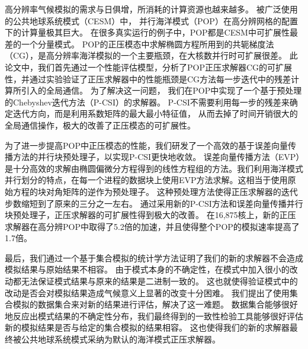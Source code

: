 \begin{cabstract}
  高分辨率气候模拟的需求与日俱增，所消耗的计算资源也越来越多。 
  被广泛使用的公共地球系统模式（CESM）中， 并行海洋模式（POP）在高分辨网格的配置下的计算量极其巨大。
  在很多真实运行的例子中，POP都是CESM中可扩展性最差的一个分量模式。 
  POP的正压模态中求解椭圆方程所用到的共轭梯度法（CG），是高分辨率海洋模拟的一个主要瓶颈，在大核数并行时可扩展很差。
  此论文中，我们首先通过一个性能评估模型，分析了POP正压求解器CG的可扩展性，并通过实验验证了正压求解器中的性能瓶颈是CG方法每一步迭代中的残差计算所引入的全局通信。 
  为了解决这一问题， 我们在POP中实现了一个基于预处理的Chebyshev迭代方法（P-CSI）的求解器。
  P-CSI不需要利用每一步的残差来确定迭代方向，而是利用系数矩阵的最大最小特征值，
  从而去掉了时间开销很大的全局通信操作，极大的改善了正压模态的可扩展性。

  为了进一步提高POP中正压模态的性能，我们研发了一个高效的基于误差向量传播方法的并行块预处理子，以实现P-CSI更快地收敛。 
  误差向量传播方法（EVP）是十分高效的求解由椭圆偏微分方程得到的线性方程组的方法。我们利用海洋模式并行划分的特点，在每一个进程的数据块上使用EVP方法求解。这相当于使用原始方程的块对角矩阵的逆作为预处理子。
  这种预处理方法使得正压求解器的迭代步数缩短到了原来的三分之一左右。 
  通过采用新的P-CSI方法和误差向量传播并行块预处理子，正压求解器的可扩展性得到极大的改善。 在16,875核上，新的正压求解器在高分辨POP中取得了5.2倍的加速，并且使得整个POP的模拟速率提高了1.7倍。 
  

  最后，我们通过一个基于集合模拟的统计学方法证明了我们的新的求解器不会造成模拟结果与原始结果不相容。 
  由于模式本身的不确定性，在模式中加入很小的改动都无法保证模式结果与原来的结果是二进制一致的。
  这也就使得验证模式中的改动是否会对模拟结果造成气候意义上显著的改变十分困难。
  我们提出了使用集合模拟的数据集合来对新的结果进行评估，解决了这一难题。 数据集合能够很好地反应出模式结果的不确定性分布，我们最终得到的一致性检验工具能够很好评估新的模拟结果是否与给定的集合模拟的结果相容。  
  这也使得我们的新的求解器最终被公共地球系统模式采纳为默认的海洋模式正压求解器。

\end{cabstract}


